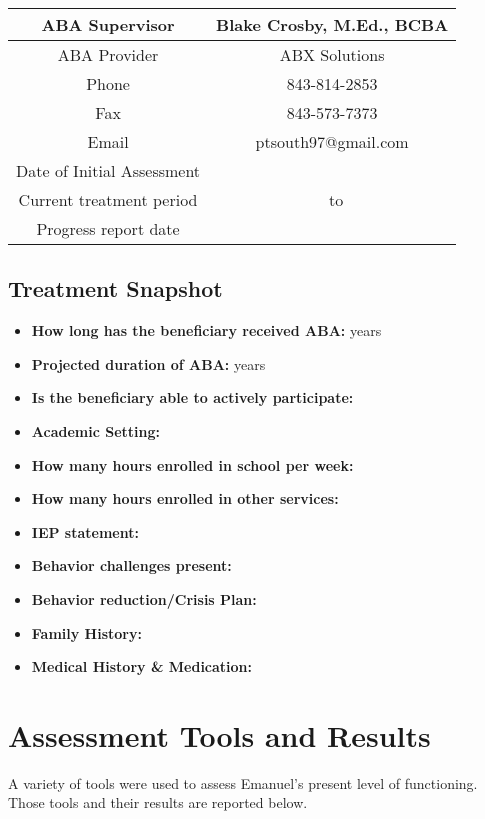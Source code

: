 \documentclass{article}
\def\initial{}
\def\start{}
\def\ending{}
\def\progduemonth{}
\def\progdueyear{}
\begin{document}
		\begin{tabular}{|c||c|} 
		\hline\hline
		ABA Supervisor & Blake Crosby, M.Ed., BCBA\\
		\hline\hline
		ABA Provider &  ABX Solutions \\
		\hline\hline
		Phone & 843-814-2853 \\
		\hline\hline
		Fax & 843-573-7373\\
		\hline\hline
		Email & ptsouth97@gmail.com\\
		\hline\hline
		Date of Initial Assessment & \initial\\
		\hline\hline
		Current treatment period & \start\ to \ending\\
		\hline\hline
		Progress report date & \progduemonth\ \progdueyear\\
		\hline\hline
		\end{tabular}

	\subsection{Treatment Snapshot}

		\begin{itemize}
		\item \textbf{How long has the beneficiary received ABA:} years
		\item \textbf{Projected duration of ABA:} years
		\item \textbf{Is the beneficiary able to actively participate:} 
		\item \textbf{Academic Setting:} 
		\item \textbf{How many hours enrolled in school per week:}
		\item \textbf{How many hours enrolled in other services:} 
		\item \textbf{IEP statement:}  
		\item \textbf{Behavior challenges present:} 
		\item \textbf{Behavior reduction/Crisis Plan:} 
		\item \textbf{Family History:} 
		\item \textbf{Medical History \& Medication:} 
		\end{itemize}

\section{Assessment Tools and Results}
A variety of tools were used to assess Emanuel’s present level of functioning.  Those tools and their results are reported below.  
\end{document}
